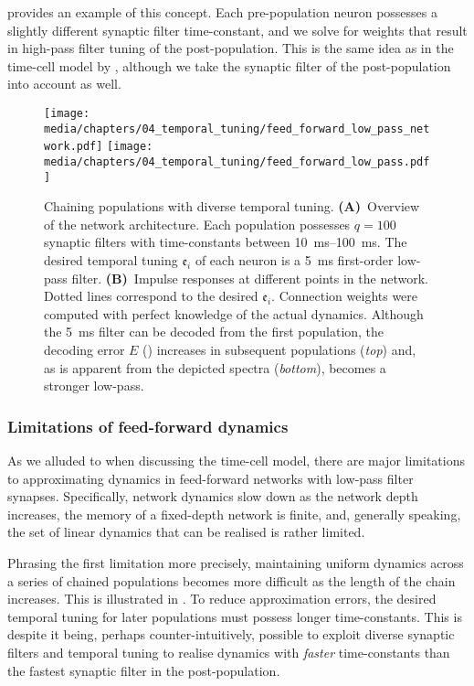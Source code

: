  provides an example of this concept.
Each pre-population neuron possesses a slightly different synaptic filter time-constant, and we solve for weights that result in high-pass filter tuning of the post-population.
This is the same idea as in the time-cell model by \citet{howard2014unified}, although we take the synaptic filter of the post-population into account as well.

\begin{figure}[p]
	\centering
	\texttt{[image: media/chapters/04\_temporal\_tuning/feed\_forward\_low\_pass\_network.pdf]}
	\texttt{[image: media/chapters/04\_temporal\_tuning/feed\_forward\_low\_pass.pdf]}
	\caption[Chaining populations with diverse temporal tuning]{Chaining populations with diverse temporal tuning. \textbf{(A)}~Overview of the network architecture. Each population possesses $q = 100$ synaptic filters with time-constants between \SIrange{10}{100}{\milli\second}.
	The desired temporal tuning $\mathfrak{e}_i$ of each neuron is a \SI{5}{\milli\second} first-order low-pass filter.
	\textbf{(B)}~Impulse responses at different points in the network.
	Dotted lines correspond to the desired $\mathfrak{e}_i$.
	Connection weights were computed with perfect knowledge of the actual dynamics.
	Although the \SI{5}{\milli\second} filter can be decoded from the first population, the decoding error $E$ (\NRMSE) increases in subsequent populations (\emph{top}) and, as is apparent from the depicted spectra (\emph{bottom}), becomes a stronger low-pass.
	\label{fig:feed_forward_low_pass}
	}
\end{figure}

\subsubsection{Limitations of feed-forward dynamics}
As we alluded to when discussing the \citet{howard2014unified} time-cell model, there are major limitations to approximating dynamics in feed-forward networks with low-pass filter synapses.
Specifically, network dynamics slow down as the network depth increases, the memory of a fixed-depth network is finite, and, generally speaking, the set of linear dynamics that can be realised is rather limited.

Phrasing the first limitation more precisely, maintaining uniform dynamics across a series of chained populations becomes more difficult as the length of the chain increases.
This is illustrated in .
To reduce approximation errors, the desired temporal tuning for later populations must possess longer time-constants.
This is despite it being, perhaps counter-intuitively, possible to exploit diverse synaptic filters and temporal tuning to realise dynamics with \emph{faster} time-constants than the fastest synaptic filter in the post-population.

